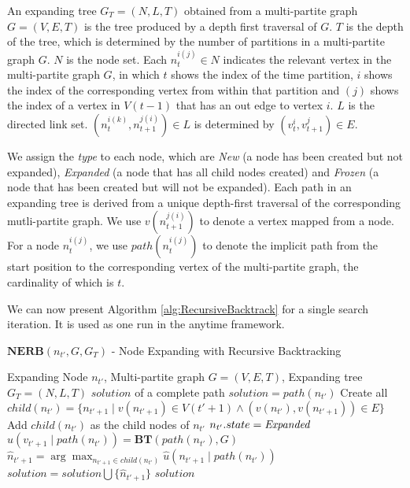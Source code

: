 \begin{mydef}
\label{def:expanding_tree}
An expanding tree $ G_{T} = (N, L, T) $ obtained from a multi-partite graph $ G = (V, E, T) $ is the tree produced by a depth first traversal of $ G $.
$ T $ is the depth of the tree, which is determined by the number of partitions in a multi-partite graph $ G $.
$ N $ is the node set. Each $ n_{t}^{i(j)} \in N $ indicates the relevant vertex in the multi-partite graph $ G $, in which $ t $ shows the index of the time partition, $ i $ shows the index of the corresponding vertex from within that partition and $ (j) $ shows the index of a vertex in $ V(t-1) $ that has an out edge to vertex $ i $.
$ L $ is the directed link set. $ (n^{i(k)}_{t}, n^{j(i)}_{t+1})  \in L $ is determined by $ (v^{i}_{t}, v^{j}_{t+1} ) \in E $.
\end{mydef}
We assign the {\em type} to each node, which are \emph{New} (a node has been created but not expanded), 
\emph{Expanded} (a node that has all child nodes created) and 
\emph{Frozen} (a node that has been created but will not be expanded).
Each path in an expanding tree is derived from a unique depth-first traversal of the corresponding mutli-partite graph.
We use $ v(n^{j(i)}_{t+1}) $ to denote a vertex mapped from a node.
For a node $ n_{t}^{i(j)} $, we use $ path(n_{t}^{i(j)}) $ to denote the implicit path from the start position to the corresponding vertex of the multi-partite graph, the cardinality of which is $ t $.

We can now present Algorithm \ref{alg:RecursiveBacktrack} for a single search iteration.
It is used as one run in the anytime framework.

\begin{algorithm}
\caption{ $ \mathbf{NERB}( n_{t'}, G, G_{T} ) $ - Node Expanding with Recursive Backtracking }
\label{alg:RecursiveBacktrack}
\begin{algorithmic}[1]
\REQUIRE 
Expanding Node $ n_{t'} $, Multi-partite graph $ G = (V, E, T) $, Expanding tree $ G_{T} = (N, L, T) $
\ENSURE $ solution $ of a complete path
\STATE $ solution = path(n_{t'}) $ 
\STATE  Create all $ child(n_{t'}) = \{ n_{t'+1} \mid v(n_{t'+1}) \in V(t'+1) \land (v(n_{t'}), v(n_{t'+1})) \in E  \} $
\STATE  Add $ child(n_{t'}) $ as the child nodes of $ n_{t'} $
\STATE  $ n_{t'}.state = \mbox{\emph{Expanded}} $
\STATE  $ \hat{u}( v_{t'+1} \mid path(n_{t'}) ) = \mathbf{BT}( path(n_{t'}) , G ) $
\STATE  $ \hat{n}_{t'+1} = \arg \max_{n_{t'+1} \in child(n_{t'})} \hat{u}( n_{t'+1} \mid path(n_{t'}) ) $
\STATE  $ solution = solution \bigcup \{ \hat{n}_{t'+1} \} $
\ENDFOR 
\RETURN $ solution $
\end{algorithmic}
\end{algorithm}

